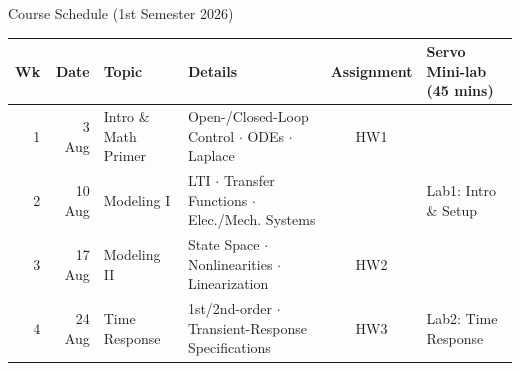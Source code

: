 \documentclass[12pt, aspectratio=169]{beamer}
\begin{document}
\begin{frame}{Course Schedule (1st Semester 2026)}

    \renewcommand{\arraystretch}{1.25}
    \setlength{\tabcolsep}{3pt}
    \tiny

    
    \begin{tabular}{r|r|l|l|c|l}
    \hline
    \rowcolor{brandred20}
    \textbf{Wk} & \textbf{Date} & \textbf{Topic} & \textbf{Details} & \textbf{Assignment} &\textbf{Servo Mini-lab (45 mins)} \\
    \hline
    1 & 3 Aug & Intro \& Math Primer & Open-/Closed-Loop Control $\cdot$ ODEs $\cdot$ Laplace & HW1 & \\
    2 & 10 Aug & Modeling I & LTI $\cdot$ Transfer Functions $\cdot$ Elec./Mech. Systems & & Lab1: Intro \& Setup\\
    3 & 17 Aug & Modeling II & State Space $\cdot$ Nonlinearities $\cdot$ Linearization & HW2 & \\
    4 & 24 Aug & Time Response & 1st/2nd-order $\cdot$ Transient-Response Specifications& HW3 & Lab2: Time Response\\

\end{tabular}
\end{frame}
\end{document}
